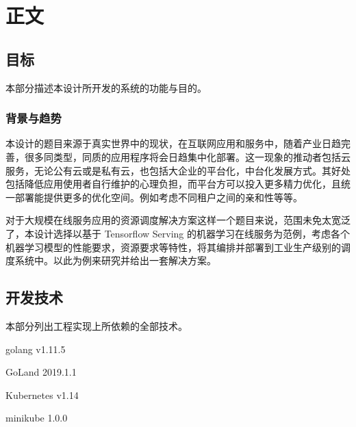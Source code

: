 
\newcommand{\paragraphnl}[1]{\paragraph{#1}\hspace{0pt}\\}

\section{正文}

\subsection{目标}

本部分描述本设计所开发的系统的功能与目的。

\subsubsection{背景与趋势}

本设计的题目来源于真实世界中的现状，在互联网应用和服务中，随着产业日趋完善，很多同类型，同质的应用程序将会日趋集中化部署。这一现象的推动者包括云服务，无论公有云或是私有云，也包括大企业的平台化，中台化发展方式。其好处包括降低应用使用者自行维护的心理负担，而平台方可以投入更多精力优化，且统一部署能提供更多的优化空间。例如考虑不同租户之间的亲和性等等。

对于大规模在线服务应用的资源调度解决方案这样一个题目来说，范围未免太宽泛了，本设计选择以基于 Tensorflow Serving 的机器学习在线服务为范例，考虑各个机器学习模型的性能要求，资源要求等特性，将其编排并部署到工业生产级别的调度系统中。以此为例来研究并给出一套解决方案。


\subsection{开发技术}

本部分列出工程实现上所依赖的全部技术。

golang v1.11.5

GoLand 2019.1.1

Kubernetes v1.14

minikube 1.0.0

